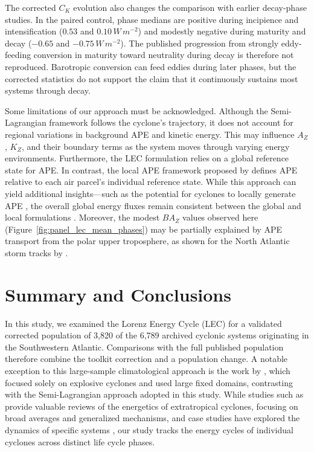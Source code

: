 \documentclass[pdflatex,sn-chicago]{sn-jnl}%
\theoremstyle{plain}
\theoremstyle{definition}
\theoremstyle{remark}
\theoremstyle{definition}
\begin{document}
The corrected $C_K$ evolution also changes the comparison with earlier decay-phase studies. In the paired control, phase medians are positive during incipience and intensification ($0.53$ and $0.10\,W\,m^{-2}$) and modestly negative during maturity and decay ($-0.65$ and $-0.75\,W\,m^{-2}$). The published progression from strongly eddy-feeding conversion in maturity toward neutrality during decay is therefore not reproduced. Barotropic conversion can feed eddies during later phases, but the corrected statistics do not support the claim that it continuously sustains most systems through decay.

Some limitations of our approach must be acknowledged. Although the Semi-Lagrangian framework follows the cyclone's trajectory, it does not account for regional variations in background APE and kinetic energy. This may influence $A_Z$, $K_Z$, and their boundary terms as the system moves through varying energy environments. Furthermore, the LEC formulation relies on a global reference state for APE. In contrast, the local APE framework proposed by \citet{novak2018local} defines APE relative to each air parcel’s individual reference state. While this approach can yield additional insights—such as the potential for cyclones to locally generate APE \citep{federer2024local}, the overall global energy fluxes remain consistent between the global and local formulations \citep{liu2024systematic}. Moreover, the modest $BA_Z$ values observed here (Figure~\ref{fig:panel_lec_mean_phases}) may be partially explained by APE transport from the polar upper troposphere, as shown for the North Atlantic storm tracks by \citet{federer2025synoptic}.

\section{Summary and Conclusions}\label{sec:conclusion}

In this study, we examined the Lorenz Energy Cycle (LEC) for a validated corrected population of 3,820 of the 6,789 archived cyclonic systems originating in the Southwestern Atlantic. Comparisons with the full published population therefore combine the toolkit correction and a population change. A notable exception to this large-sample climatological approach is the work by \citet{black2013universal}, which focused solely on explosive cyclones and used large fixed domains, contrasting with the Semi-Lagrangian approach adopted in this study. While studies such as \citet{smith1980energetics} provide valuable reviews of the energetics of extratropical cyclones, focusing on broad averages and generalized mechanisms, and case studies have explored the dynamics of specific systems \citep[e.g.]{pezza2014large,dias2011energy,cavicchia2018energetics}, our study tracks the energy cycles of individual cyclones across distinct life cycle phases.
\end{document}
